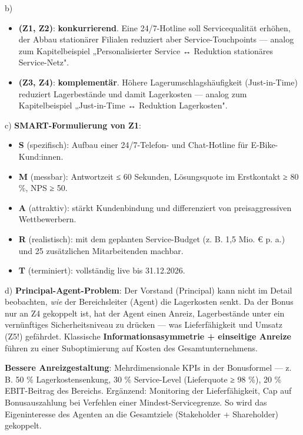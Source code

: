 \documentclass[11pt, a4paper]{article}
\begin{document}
b)

\begin{itemize}
  \item \textbf{(Z1, Z2)}: \textbf{konkurrierend}. Eine 24/7-Hotline soll Servicequalität erhöhen, der Abbau stationärer Filialen reduziert aber Service-Touchpoints — analog zum Kapitelbeispiel „Personalisierter Service ↔ Reduktion stationäres Service-Netz".
  \item \textbf{(Z3, Z4)}: \textbf{komplementär}. Höhere Lagerumschlagshäufigkeit (Just-in-Time) reduziert Lagerbestände und damit Lagerkosten — analog zum Kapitelbeispiel „Just-in-Time ↔ Reduktion Lagerkosten".
\end{itemize}

c) \textbf{SMART-Formulierung von Z1}:

\begin{itemize}
  \item \textbf{S} (spezifisch): Aufbau einer 24/7-Telefon- und Chat-Hotline für E-Bike-Kund:innen.
  \item \textbf{M} (messbar): Antwortzeit ≤ 60 Sekunden, Lösungsquote im Erstkontakt ≥ 80 \%, NPS ≥ 50.
  \item \textbf{A} (attraktiv): stärkt Kundenbindung und differenziert von preisaggressiven Wettbewerbern.
  \item \textbf{R} (realistisch): mit dem geplanten Service-Budget (z. B. 1,5 Mio. € p. a.) und 25 zusätzlichen Mitarbeitenden machbar.
  \item \textbf{T} (terminiert): vollständig live bis 31.12.2026.
\end{itemize}

d) \textbf{Principal-Agent-Problem}: Der Vorstand (Principal) kann nicht im Detail beobachten, \textit{wie} der Bereichsleiter (Agent) die Lagerkosten senkt. Da der Bonus nur an Z4 gekoppelt ist, hat der Agent einen Anreiz, Lagerbestände unter ein vernünftiges Sicherheitsniveau zu drücken — was Lieferfähigkeit und Umsatz (Z5!) gefährdet. Klassische \textbf{Informationsasymmetrie + einseitige Anreize} führen zu einer Suboptimierung auf Kosten des Gesamtunternehmens.


\textbf{Bessere Anreizgestaltung}: Mehrdimensionale KPIs in der Bonusformel — z. B. 50 \% Lagerkostensenkung, 30 \% Service-Level (Lieferquote ≥ 98 \%), 20 \% EBIT-Beitrag des Bereichs. Ergänzend: Monitoring der Lieferfähigkeit, Cap auf Bonusauszahlung bei Verfehlen einer Mindest-Servicegrenze. So wird das Eigeninteresse des Agenten an die Gesamtziele (Stakeholder + Shareholder) gekoppelt.
\end{document}
